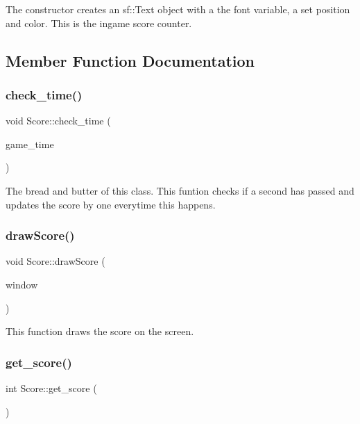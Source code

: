 The constructor creates an sf\+::\+Text object with a the font variable, a set position and color. This is the ingame score counter. 

\subsection{Member Function Documentation}
\mbox{\label{classScore_a4e4e4e4d043b7b4574827b5a670d55a0}} 
\subsubsection{\texorpdfstring{check\+\_\+time()}{check\_time()}}
{\footnotesize\ttfamily void Score\+::check\+\_\+time (\begin{DoxyParamCaption}\item[{sf\+::\+Time}]{game\+\_\+time }\end{DoxyParamCaption})}

The bread and butter of this class. This funtion checks if a second has passed and updates the score by one everytime this happens. \mbox{\label{classScore_a933dc121ad262cd9729f973e02a70cf2}} 
\subsubsection{\texorpdfstring{draw\+Score()}{drawScore()}}
{\footnotesize\ttfamily void Score\+::draw\+Score (\begin{DoxyParamCaption}\item[{sf\+::\+Render\+Window \&}]{window }\end{DoxyParamCaption})}

This function draws the score on the screen. \mbox{\label{classScore_a0edd6880a4747e9ec07751030bdd4689}} 
\subsubsection{\texorpdfstring{get\+\_\+score()}{get\_score()}}
{\footnotesize\ttfamily int Score\+::get\+\_\+score (\begin{DoxyParamCaption}{ }\end{DoxyParamCaption})}

